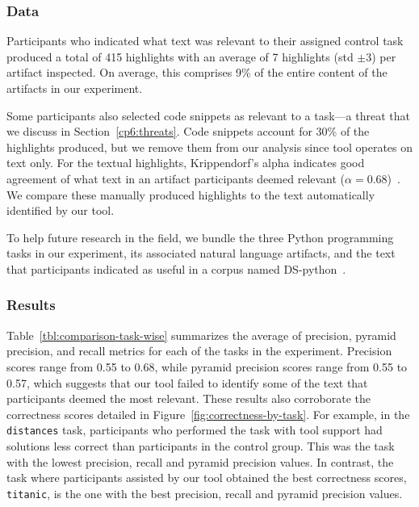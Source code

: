 \subsubsection{Data}






Participants who indicated what text was relevant to their assigned control task produced a total of 415 highlights with an average of 7 highlights (std $\pm 3$) per artifact inspected.
On average, this comprises 9\% of the entire content of the artifacts in our experiment. 


Some participants also selected code snippets as relevant to a task---a threat that we discuss in Section~\ref{cp6:threats}. 
Code snippets account for 30\% of the highlights produced, but we remove them from our analysis since \acs{tool} 
operates on text only. For the textual highlights,
Krippendorf's alpha indicates good agreement of what text in an artifact participants deemed relevant ($\alpha = 0.68$)~\cite{Krippendorff1980, passonneau2006}.
We compare these manually produced highlights to the text automatically identified by our tool.



To help future research in the field, we bundle the three Python programming tasks in our experiment, its associated natural language artifacts, and the text that participants indicated as useful in a corpus named \acs{DS-python}~\cite{dspython}.



\subsubsection{Results}



Table~\ref{tbl:comparison-task-wise} summarizes the average of precision, pyramid precision, and recall metrics for each of the tasks in the experiment.
Precision scores range from 0.55 to 0.68, while pyramid precision scores range from 0.55 to 0.57, which suggests that our tool failed to identify some of the text that participants deemed the most relevant.
These results also corroborate 
the correctness scores detailed in Figure~\ref{fig:correctness-by-task}. For example, 
in the \texttt{distances} task, participants who performed the task with tool support had solutions less correct than participants in the control group.
This was the task with the lowest precision, recall and pyramid precision values. 
In contrast, the task where participants assisted by our tool obtained the best correctness scores, \texttt{titanic}, is the one with the best precision, recall and pyramid precision values.





